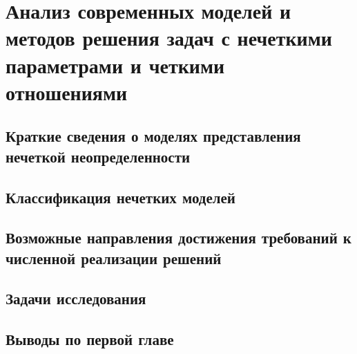 \chapter{Анализ современных моделей и методов решения задач с нечеткими параметрами и четкими отношениями}
\label{chapter1}

\section{Краткие сведения о моделях представления нечеткой неопределенности}
\label{chapter1_1}


\section{Классификация нечетких моделей} 
\label{chapter1_2}


\section{Возможные направления достижения требований к численной реализации решений} 
\label{chapter1_3}


\section{Задачи исследования} 
\label{chapter1_4}


\section{Выводы по первой главе}
\label{chapter1_5}
